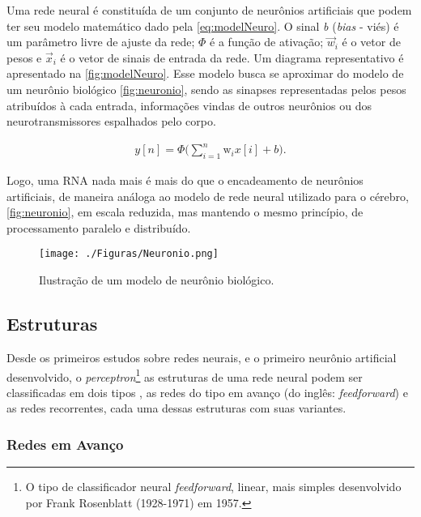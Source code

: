 Uma rede neural é constituída de um conjunto de neurônios artificiais que podem ter seu modelo matemático dado pela \autoref{eq:modelNeuro}. O sinal \textit{b} (\textit{bias} - viés) é um parâmetro livre de ajuste da rede; $\Phi$ é a função de ativação; $\vec{w}_i$ é o vetor de pesos e $\vec{x}_i$ é o vetor de sinais de entrada da rede. Um diagrama representativo é apresentado na \autoref{fig:modelNeuro}. Esse modelo busca se aproximar do modelo de um neurônio biológico \autoref{fig:neuronio}, sendo as sinapses representadas pelos pesos atribuídos à cada entrada, informações vindas de outros neurônios ou dos neurotransmissores espalhados pelo corpo. 


\begin{eqnarray}
y[n] = \Phi\Big(\sum_{i=1}^n \mathrm{w}_ix[i] + b\Big).   \label{eq:modelNeuro}
\end{eqnarray}

Logo, uma RNA nada mais é mais do que o encadeamento de neurônios artificiais, de maneira análoga ao modelo de rede neural utilizado para o cérebro, \autoref{fig:neuronio}, em escala reduzida, mas mantendo o mesmo princípio, de processamento paralelo e distribuído.

\begin{figure}[H]
	\begin{center}   
		\caption{Ilustração de um modelo de neurônio biológico.}
		\label{fig:neuronio}
		\texttt{[image: ./Figuras/Neuronio.png]}
	\end{center}
\end{figure}

\subsection{Estruturas}

Desde os primeiros estudos sobre redes neurais, e o primeiro neurônio artificial desenvolvido, o \textit{perceptron}\footnote{O tipo de classificador neural \textit{feedforward}, linear, mais simples desenvolvido por Frank Rosenblatt (1928-1971) em 1957.} as estruturas de uma rede neural podem ser classificadas em dois tipos \cite{thesis:boccato2013, book:simonhaykin2008}, as redes do tipo em avanço (do inglês: \textit{feedforward}) e as redes recorrentes, cada uma dessas estruturas com suas variantes.

\subsubsection{Redes em Avanço}

